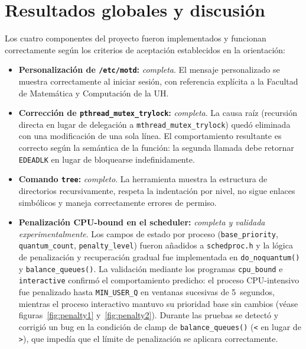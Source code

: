 \documentclass[11pt,a4paper]{article}
\begin{document}
\clearpage

\section{Resultados globales y discusi\'on}

Los cuatro componentes del proyecto fueron implementados y funcionan correctamente seg\'un los criterios de aceptaci\'on establecidos en la orientaci\'on:

\begin{itemize}[leftmargin=*]
  \item \textbf{Personalizaci\'on de \texttt{/etc/motd}:} \emph{completa}. El mensaje personalizado se muestra correctamente al iniciar sesi\'on, con referencia expl\'icita a la Facultad de Matem\'atica y Computaci\'on de la UH.
  \item \textbf{Correcci\'on de \texttt{pthread\_mutex\_trylock}:} \emph{completa}. La causa ra\'iz (recursi\'on directa en lugar de delegaci\'on a \texttt{mthread\_mutex\_trylock}) qued\'o eliminada con una modificaci\'on de una sola l\'inea. El comportamiento resultante es correcto seg\'un la sem\'antica de la funci\'on: la segunda llamada debe retornar \texttt{EDEADLK} en lugar de bloquearse indefinidamente.
  \item \textbf{Comando \texttt{tree}:} \emph{completo}. La herramienta muestra la estructura de directorios recursivamente, respeta la indentaci\'on por nivel, no sigue enlaces simb\'olicos y maneja correctamente errores de permiso.
  \item \textbf{Penalizaci\'on CPU-bound en el scheduler:} \emph{completa y validada experimentalmente}. Los campos de estado por proceso (\texttt{base\_priority}, \texttt{quantum\_count}, \texttt{penalty\_level}) fueron a\~nadidos a \texttt{schedproc.h} y la l\'ogica de penalizaci\'on y recuperaci\'on gradual fue implementada en \texttt{do\_noquantum()} y \texttt{balance\_queues()}. La validaci\'on mediante los programas \texttt{cpu\_bound} e \texttt{interactive} confirm\'o el comportamiento predicho: el proceso CPU-intensivo fue penalizado hasta \texttt{MIN\_USER\_Q} en ventanas sucesivas de 5~segundos, mientras el proceso interactivo mantuvo su prioridad base sin cambios (v\'ease figuras~\ref{fig:penalty1} y~\ref{fig:penalty2}). Durante las pruebas se detect\'o y corrigi\'o un bug en la condici\'on de clamp de \texttt{balance\_queues()} (\texttt{<} en lugar de \texttt{>}), que imped\'ia que el l\'imite de penalizaci\'on se aplicara correctamente.
\end{itemize}
\end{document}
